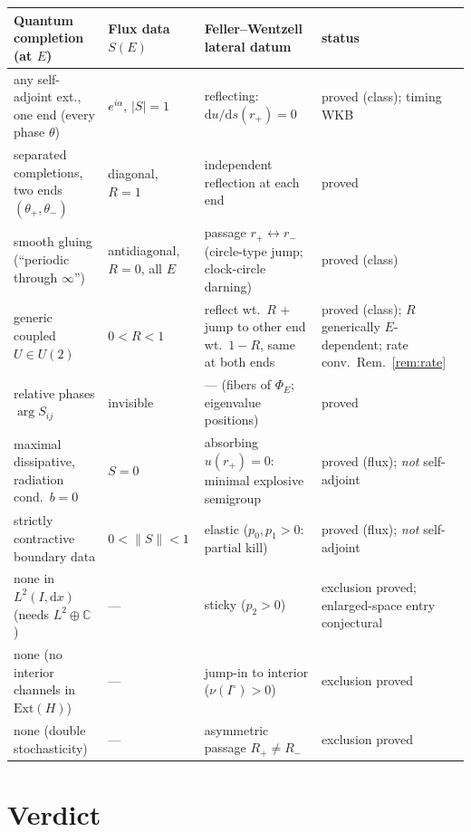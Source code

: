 \documentclass[11pt]{article}
\theoremstyle{remark}
\newcommand{\dd}{\mathrm{d}}
\newcommand{\C}{\mathbb{C}}
\newcommand{\Ext}{\mathrm{Ext}}
\begin{document}
\begin{center}
\renewcommand{\arraystretch}{1.35}
\small
\begin{tabular}{p{}|p{}|p{}|p{}}
\textbf{Quantum completion (at $E$)} & \textbf{Flux data $S(E)$} &
\textbf{Feller--Wentzell lateral datum} & \textbf{status}\\
\hline
any self-adjoint ext., one end (every phase $\theta$) &
$e^{i\alpha}$, $|S|=1$ &
reflecting: $\dd u/\dd s(r_+)=0$ &
proved (class); timing WKB\\
separated completions, two ends $(\theta_+,\theta_-)$ &
diagonal, $R=1$ &
independent reflection at each end &
proved\\
smooth gluing (``periodic through $\infty$'') &
antidiagonal, $R=0$, all $E$ &
passage $r_+\!\leftrightarrow r_-$ (circle-type jump; clock-circle
darning) &
proved (class)\\
generic coupled $U\in U(2)$ &
$0<R<1$ &
reflect wt.\ $R$ $+$ jump to other end wt.\ $1-R$, same at both ends &
proved (class); $R$ generically $E$-dependent; rate conv.\
Rem.~\ref{rem:rate}\\
relative phases $\arg S_{ij}$ &
invisible &
--- (fibers of $\Phi_E$; eigenvalue positions) &
proved\\
\hline
maximal dissipative, radiation cond.\ $b=0$ &
$S=0$ &
absorbing $u(r_+)=0$: minimal explosive semigroup &
proved (flux); \emph{not} self-adjoint\\
strictly contractive boundary data &
$0<\|S\|<1$ &
elastic ($p_0,p_1>0$: partial kill) &
proved (flux); \emph{not} self-adjoint\\
\hline
none in $L^2(I,\dd x)$ (needs $L^2\oplus\C$) & --- &
sticky ($p_2>0$) &
exclusion proved; enlarged-space entry conjectural\\
none (no interior channels in $\Ext(H)$) & --- &
jump-in to interior ($\nu(I^\circ)>0$) &
exclusion proved\\
none (double stochasticity) & --- &
asymmetric passage $R_+\ne R_-$ &
exclusion proved\\
\end{tabular}
\end{center}

\section*{Verdict}
\end{document}
